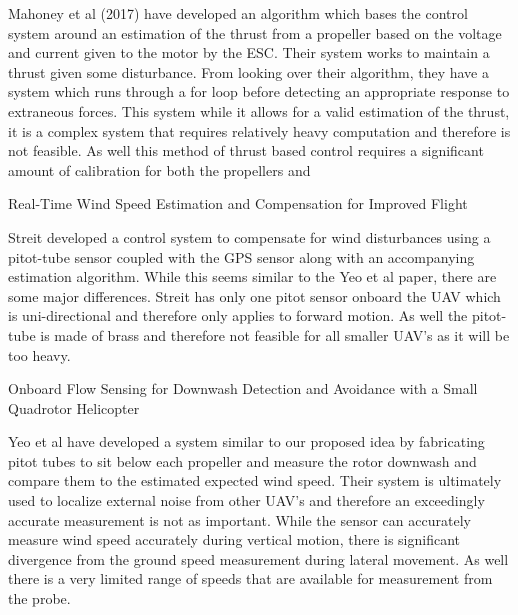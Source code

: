 \documentclass[twocolumn]{article}
\begin{document}
	Mahoney et al (2017) have developed an algorithm which bases the control system around an estimation of the thrust from a propeller based on the voltage and current given to the motor by the ESC. Their system works to maintain a thrust given some disturbance. From looking over their algorithm, they have a system which runs through a for loop before detecting an appropriate response to extraneous forces. This system while it allows for a valid estimation of the thrust, it is a complex system that requires relatively heavy computation and therefore is not feasible. As well this method of thrust based control requires a significant amount of calibration for both the propellers and 
	
	Real-Time Wind Speed Estimation and Compensation for Improved Flight
	
	Streit developed a control system to compensate for wind disturbances using a pitot-tube sensor coupled with the GPS sensor along with an accompanying estimation algorithm. While this seems similar to the Yeo et al paper, there are some major differences. Streit has only one pitot sensor onboard the UAV which is uni-directional and therefore only applies to forward motion. As well the pitot-tube is made of brass and therefore not feasible for all smaller UAV's as it will be too heavy. 
	
	Onboard Flow Sensing for Downwash Detection and Avoidance with a Small Quadrotor Helicopter
	
	Yeo et al have developed a system similar to our proposed idea by fabricating pitot tubes to sit below each propeller and measure the rotor downwash and compare them to the estimated expected wind speed. Their system is ultimately used to localize external noise from other UAV's and therefore an exceedingly accurate measurement is not as important. While the sensor can accurately measure wind speed accurately during vertical motion, there is significant divergence from the ground speed measurement during lateral movement. As well there is a very limited range of speeds that are available for measurement from the probe. 
\end{document}
